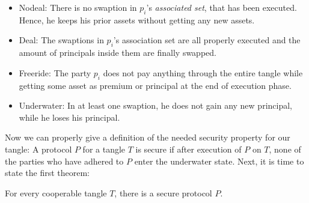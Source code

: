 \begin{itemize}
    \item Nodeal: There is no swaption in $p_i$'s {\it associated set}, that has been executed. Hence, he keeps his prior assets without getting any new assets.

    \item Deal: The swaptions in $p_i$'s association set are all properly executed and the amount of principals inside them are finally swapped.


    \item Freeride: The party $p_i$ does not pay anything through the entire tangle while getting some asset as premium or principal at the end of execution phase.

    \item Underwater: In at least one swaption, he does not gain any new principal, while he loses his principal.

\end{itemize}
Now we can properly give a definition of the needed security property for our tangle: 
A protocol $P$ for a tangle $T$ is secure if after execution of $P$ on $T$, none of the parties who have adhered to $P$ enter the underwater state.
Next, it is time to state the first theorem:
\begin{theorem}
\label{th:concurrency}
For every cooperable tangle $T$, there is a secure protocol $P$.

\end{theorem}

